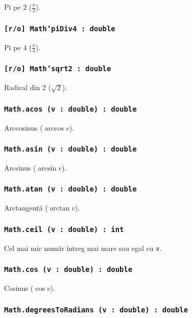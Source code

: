 Pi pe 2 ($\frac{\pi}{2}$).

\subsubsection{\texttt{[r/o] Math'piDiv4 : double}}

Pi pe 4 ($\frac{\pi}{4}$).

\subsubsection{\texttt{[r/o] Math'sqrt2 : double}}

Radical din 2 ($\sqrt{2}$).

\subsubsection{\texttt{Math.acos (v : double) : double}}

Arccosinus ($\arccos{v}$).

\subsubsection{\texttt{Math.asin (v : double) : double}}

Arcsinus ($\arcsin{v}$).

\subsubsection{\texttt{Math.atan (v : double) : double}}

Arctangență ($\arctan{v}$).

\subsubsection{\texttt{Math.ceil (v : double) : int}}

Cel mai mic număr întreg mai mare sau egal cu \texttt{v}.

\subsubsection{\texttt{Math.cos (v : double) : double}}

Cosinus ($\cos{v}$).

\subsubsection{\texttt{Math.degreesToRadians (v : double) : double}}

